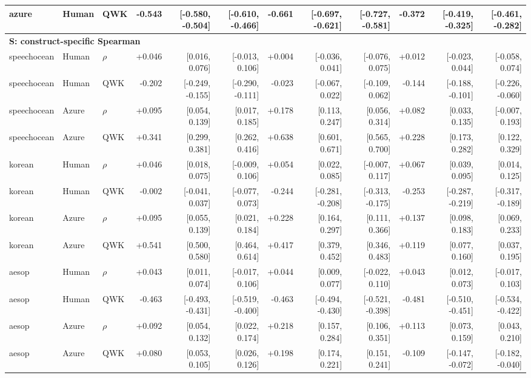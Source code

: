 \documentclass[10pt]{article}
\begin{document}
\begin{landscape}
\begin{longtable}{@{}lllrrrrrrrrr@{}}
azure & Human & QWK & -0.543 & [-0.580, -0.504] & [-0.610, -0.466] & -0.661 & [-0.697, -0.621] & [-0.727, -0.581] & -0.372 & [-0.419, -0.325] & [-0.461, -0.282]\\
\midrule\multicolumn{12}{l}{\textbf{S: construct-specific Spearman}}\\*
speechocean & Human & $\rho$ & +0.046 & [0.016, 0.076] & [-0.013, 0.106] & +0.004 & [-0.036, 0.041] & [-0.076, 0.075] & +0.012 & [-0.023, 0.044] & [-0.058, 0.074]\\
speechocean & Human & QWK & -0.202 & [-0.249, -0.155] & [-0.290, -0.111] & -0.023 & [-0.067, 0.022] & [-0.109, 0.062] & -0.144 & [-0.188, -0.101] & [-0.226, -0.060]\\
speechocean & Azure & $\rho$ & +0.095 & [0.054, 0.139] & [0.017, 0.185] & +0.178 & [0.113, 0.247] & [0.056, 0.314] & +0.082 & [0.033, 0.135] & [-0.007, 0.193]\\
speechocean & Azure & QWK & +0.341 & [0.299, 0.381] & [0.262, 0.416] & +0.638 & [0.601, 0.671] & [0.565, 0.700] & +0.228 & [0.173, 0.282] & [0.122, 0.329]\\
\addlinespace[2pt]
korean & Human & $\rho$ & +0.046 & [0.018, 0.075] & [-0.009, 0.106] & +0.054 & [0.022, 0.085] & [-0.007, 0.117] & +0.067 & [0.039, 0.095] & [0.014, 0.125]\\
korean & Human & QWK & -0.002 & [-0.041, 0.037] & [-0.077, 0.073] & -0.244 & [-0.281, -0.208] & [-0.313, -0.175] & -0.253 & [-0.287, -0.219] & [-0.317, -0.189]\\
korean & Azure & $\rho$ & +0.095 & [0.055, 0.139] & [0.021, 0.184] & +0.228 & [0.164, 0.297] & [0.111, 0.366] & +0.137 & [0.098, 0.183] & [0.069, 0.233]\\
korean & Azure & QWK & +0.541 & [0.500, 0.580] & [0.464, 0.614] & +0.417 & [0.379, 0.452] & [0.346, 0.483] & +0.119 & [0.077, 0.160] & [0.037, 0.195]\\
\addlinespace[2pt]
aesop & Human & $\rho$ & +0.043 & [0.011, 0.074] & [-0.017, 0.106] & +0.044 & [0.009, 0.077] & [-0.022, 0.110] & +0.043 & [0.012, 0.073] & [-0.017, 0.103]\\
aesop & Human & QWK & -0.463 & [-0.493, -0.431] & [-0.519, -0.400] & -0.463 & [-0.494, -0.430] & [-0.521, -0.398] & -0.481 & [-0.510, -0.451] & [-0.534, -0.422]\\
aesop & Azure & $\rho$ & +0.092 & [0.054, 0.132] & [0.022, 0.174] & +0.218 & [0.157, 0.284] & [0.106, 0.351] & +0.113 & [0.073, 0.159] & [0.043, 0.210]\\
aesop & Azure & QWK & +0.080 & [0.053, 0.105] & [0.026, 0.126] & +0.198 & [0.174, 0.221] & [0.151, 0.241] & -0.109 & [-0.147, -0.072] & [-0.182, -0.040]\\

\end{longtable}
\end{landscape}
\end{document}
